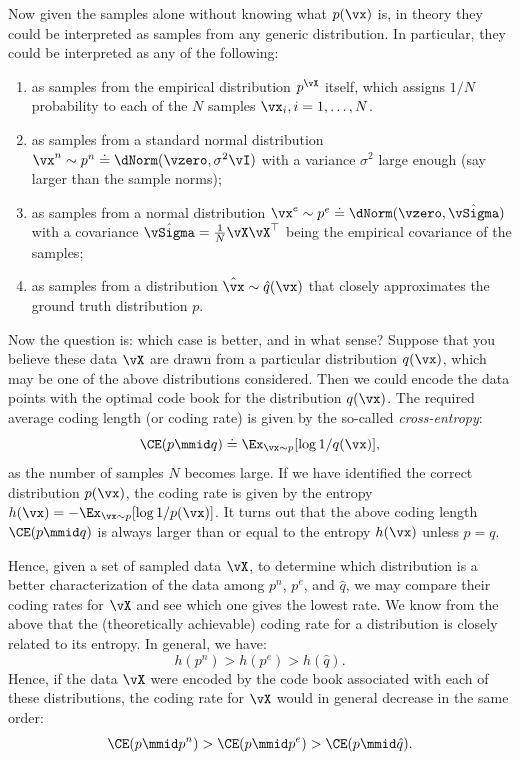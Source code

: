 \documentclass[../../book-main.tex]{subfiles}
\begin{document}
Now given the samples alone without knowing what \(p(\vx)\) is, in theory they could be interpreted as samples from any generic distribution. In particular, they could be interpreted as any of the following:
\begin{enumerate}
	\item as samples from the empirical distribution \(p^{\vX}\) itself, which assigns \(1/N\) probability to each of the \(N\) samples \(\vx_{i}, i=1, \ldots, N\).
	\item as samples from a standard normal distribution \(\vx^{n} \sim p^{n} \doteq \dNorm(\vzero, \sigma^{2} \vI)\) with a variance \(\sigma^{2}\) large enough (say larger than the sample norms);
	\item as samples from a normal distribution \(\vx^{e} \sim p^{e} \doteq \dNorm(\vzero, \hat{\vSigma})\) with a covariance \(\hat{\vSigma} = \frac{1}{N} \vX \vX^{\top}\) being the empirical covariance of the samples;
	\item as samples from a distribution \(\hat \vx \sim \hat{q}(\vx)\) that closely approximates the ground truth  distribution \(p\).
\end{enumerate}
Now the question is: which case is better, and in what sense? Suppose that you believe these data \(\vX\) are drawn from a particular distribution  \(q(\vx)\), which may be one of the above distributions considered. Then we could encode the data points with the optimal code book for the distribution \(q(\vx)\). The required average coding length (or coding rate) is given by the so-called \textit{cross-entropy}:
\begin{equation}
	\CE(p \mmid q) \doteq \Ex_{\vx \sim p}[\log 1/q(\vx)],
\end{equation}
as the number of samples \(N\) becomes large. If we have identified the correct distribution \(p(\vx)\), the coding rate is given by the entropy \(h(\vx) = - \Ex_{\vx \sim p}[\log 1/p(\vx)]\). It turns out that the above coding length \(\CE(p \mmid q)\) is always larger than or equal to the entropy \(h(\vx)\) unless \(p = q\). 

Hence, given a set of sampled data \(\vX\), to determine which distribution is a better characterization of the data among \(p^{n}\), \(p^{e}\),  and \(\hat{q}\), we may compare their coding rates for \(\vX\) and see which one gives the lowest rate. We know from the above that the (theoretically achievable) coding rate for a distribution is closely related to its entropy. In general, we have:
\begin{equation}
	h(p^{n}) > h(p^{e}) > h(\hat{q}).
\end{equation}
Hence, if the data \(\vX\) were encoded by the code book associated with each of these distributions, the coding rate for \(\vX\) would in general decrease in the same order:
\begin{equation}
	\CE(p \mmid p^{n}) > \CE(p \mmid p^{e}) > \CE(p \mmid \hat{q}).
\end{equation}
\end{document}
